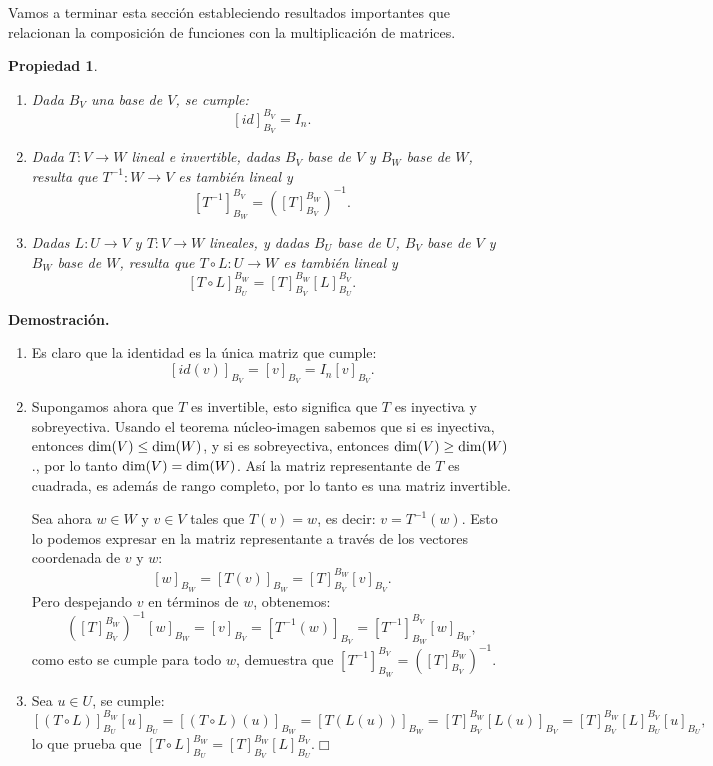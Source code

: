 \documentclass[12pt]{book}
\newtheorem{prop}{Propiedad}
\def\dim{\textup{dim}}
\begin{document}
Vamos a terminar esta sección estableciendo resultados importantes que relacionan la composición de funciones con la multiplicación de matrices.
%
\begin{prop}
\begin{enumerate}
\item Dada $B_V$ una base de $V$, se cumple: $$[id]_{B_V}^{B_V}=I_n.$$
\item Dada $T:V\rightarrow W$ lineal e invertible, dadas $B_V$ base de $V$ y $B_W$ base de $W$, resulta que $T^{-1}:W\rightarrow V$ es también lineal y
$$[T^{-1}]_{B_W}^{B_V}=\left([T]_{B_V}^{B_W}\right)^{-1}.$$
\item Dadas $L:U\rightarrow V$ y $T:V\rightarrow W$ lineales, y dadas $B_U$ base de $U$, $B_V$ base de $V$ y $B_W$ base de $W$, resulta que $T\circ L:U\rightarrow W$ es también lineal y
$$[T\circ L]_{B_U}^{B_W}=[T]_{B_V}^{B_W}[L]_{B_U}^{B_V}.$$
\end{enumerate}
\end{prop}
{\bf Demostración.} {\small
\begin{enumerate}
  \item Es claro que la identidad es la única matriz que cumple:
  $$[id(v)]_{B_V}=[v]_{B_V}=I_n[v]_{B_V}.$$
 \item Supongamos ahora que $T$ es invertible, esto significa que $T$ es inyectiva y sobreyectiva.
 Usando el teorema núcleo-imagen sabemos que si es inyectiva, entonces $\dim(V)\le \dim(W)$, y si es sobreyectiva, entonces $\dim(V)\ge\dim(W)$., por lo tanto $\dim(V)=\dim(W)$.
 Así la matriz representante de $T$ es cuadrada, es además de rango completo, por lo tanto es una matriz invertible.
 
 Sea ahora $w\in W$ y $v\in V$ tales que $T(v)=w$, es decir: $v=T^{-1}(w)$.
 Esto lo podemos expresar en la matriz representante a través de los vectores coordenada de $v$ y $w$:
 $$ [w]_{B_W}=[T(v)]_{B_W}=[T]_{B_V}^{B_W}[v]_{B_V}.$$
 Pero despejando $v$ en términos de $w$, obtenemos:
 $$ ([T]_{B_V}^{B_W})^{-1}[w]_{B_W}=[v]_{B_V}=[T^{-1}(w)]_{B_V}=[T^{-1}]_{B_W}^{B_V}[w]_{B_W},$$
 como esto se cumple para todo $w$, demuestra que $[T^{-1}]_{B_W}^{B_V}=\left([T]_{B_V}^{B_W}\right)^{-1}$.
  \item Sea $u\in U$, se cumple:
    $$[(T\circ L)]_{B_U}^{B_W}[u]_{B_U}
    =[(T\circ L)(u)]_{B_W}
    =[T(L(u))]_{B_W}
    =[T]_{B_V}^{B_W}[L(u)]_{B_V}
    =[T]_{B_V}^{B_W}[L]_{B_U}^{B_V}[u]_{B_U},$$
    lo que prueba que $[T\circ L]_{B_U}^{B_W}=[T]_{B_V}^{B_W}[L]_{B_U}^{B_V}$.\hfill $\Box$   
\end{enumerate}
}
\end{document}
